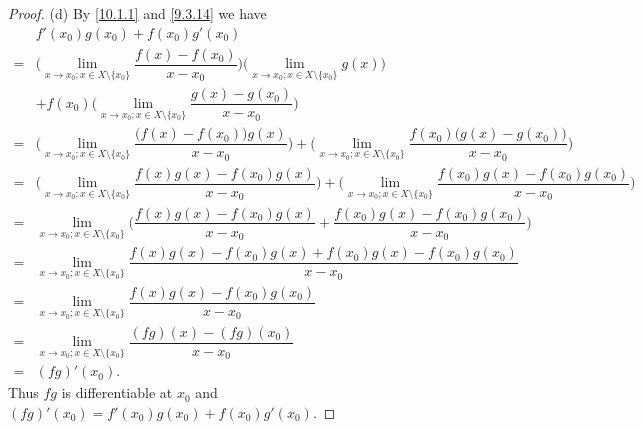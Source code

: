 \begin{proof}{(d)}
  By \cref{10.1.1} and \cref{9.3.14} we have
  \begin{align*}
      & f'(x_0) g(x_0) + f(x_0) g'(x_0)                                                                                                                                                                                   \\
    = & \bigg(\lim_{x \to x_0 ; x \in X \setminus \{x_0\}} \dfrac{f(x) - f(x_0)}{x - x_0}\bigg) \bigg(\lim_{x \to x_0 ; x \in X \setminus \{x_0\}} g(x)\bigg)                                                             \\
      & + f(x_0) \bigg(\lim_{x \to x_0 ; x \in X \setminus \{x_0\}} \dfrac{g(x) - g(x_0)}{x - x_0}\bigg)                                                                                                                  \\
    = & \bigg(\lim_{x \to x_0 ; x \in X \setminus \{x_0\}} \dfrac{\big(f(x) - f(x_0)\big) g(x)}{x - x_0}\bigg) + \bigg(\lim_{x \to x_0 ; x \in X \setminus \{x_0\}} \dfrac{f(x_0) \big(g(x) - g(x_0)\big)}{x - x_0}\bigg) \\
    = & \bigg(\lim_{x \to x_0 ; x \in X \setminus \{x_0\}} \dfrac{f(x) g(x) - f(x_0) g(x)}{x - x_0}\bigg) + \bigg(\lim_{x \to x_0 ; x \in X \setminus \{x_0\}} \dfrac{f(x_0) g(x) - f(x_0) g(x_0)}{x - x_0}\bigg)         \\
    = & \lim_{x \to x_0 ; x \in X \setminus \{x_0\}} \bigg(\dfrac{f(x) g(x) - f(x_0) g(x)}{x - x_0} + \dfrac{f(x_0) g(x) - f(x_0) g(x_0)}{x - x_0}\bigg)                                                                  \\
    = & \lim_{x \to x_0 ; x \in X \setminus \{x_0\}} \dfrac{f(x) g(x) - f(x_0) g(x) + f(x_0) g(x) - f(x_0) g(x_0)}{x - x_0}                                                                                               \\
    = & \lim_{x \to x_0 ; x \in X \setminus \{x_0\}} \dfrac{f(x) g(x) - f(x_0) g(x_0)}{x - x_0}                                                                                                                           \\
    = & \lim_{x \to x_0 ; x \in X \setminus \{x_0\}} \dfrac{(fg)(x) - (fg)(x_0)}{x - x_0}                                                                                                                                 \\
    = & (fg)'(x_0).
  \end{align*}
  Thus \(fg\) is differentiable at \(x_0\) and \((fg)'(x_0) = f'(x_0) g(x_0) + f(x_0) g'(x_0)\).
\end{proof}

